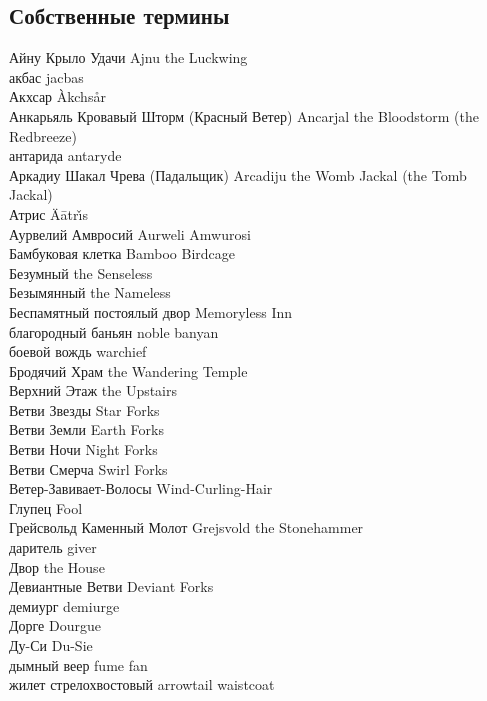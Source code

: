 \subsection{Собственные термины}

Айну Крыло Удачи \hfill Ajnu the Luckwing\\
акбас \hfill jacbas\\
Акхсар \hfill \`{A}kchs\r{a}r\\
Анкарьяль Кровавый Шторм (Красный Ветер) \hfill Ancarjal the Bloodstorm (the Redbreeze)\\
антарида \hfill antaryde\\
Аркадиу Шакал Чрева (Падальщик) \hfill Arcadiju the Womb Jackal (the Tomb Jackal)\\
Атрис \hfill \"{A}\={a}tr\v{\i}s\\
Аурвелий Амвросий \hfill Aurweli Amwurosi\\
Бамбуковая клетка \hfill Bamboo Birdcage\\
Безумный \hfill the Senseless\\
Безымянный \hfill the Nameless\\
Беспамятный постоялый двор \hfill Memoryless Inn\\
благородный баньян \hfill noble banyan\\
боевой вождь \hfill warchief\\
Бродячий Храм \hfill the Wandering Temple\\
Верхний Этаж \hfill the Upstairs\\
Ветви Звезды \hfill Star Forks\\
Ветви Земли \hfill Earth Forks\\
Ветви Ночи \hfill Night Forks\\
Ветви Смерча \hfill Swirl Forks\\
Ветер-Завивает-Волосы \hfill Wind-Curling-Hair\\
Глупец \hfill Fool\\
Грейсвольд Каменный Молот \hfill Grejsvold the Stonehammer\\
даритель \hfill giver\\
Двор \hfill the House\\
Девиантные Ветви \hfill Deviant Forks\\
демиург \hfill demiurge\\
Дорге \hfill Dourgue\\
Ду-Си \hfill Du-Sie\\
дымный веер \hfill fume fan\\
жилет стрелохвостовый \hfill arrowtail waistcoat\\
